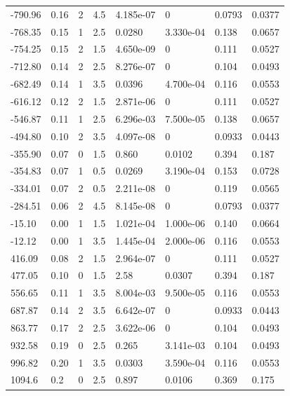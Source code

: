 \documentclass[preview]{standalone}
\begin{document}
{{\begin{tabular}{L{1.2cm}C{1.2cm} C{0.3cm}C{0.5cm} C{1.4cm}C{1.4cm} C{1.4cm}C{1.4cm}}
  -790.96  &  0.16  & 2     & 4.5 &  4.185e-07  & 0  & 0.0793 &  0.0377   \\ 
  -768.35  &  0.15  & 1     & 2.5 &  0.0280  & 3.330e-04  & 0.138 &  0.0657   \\ 
  -754.25  &  0.15  & 2     & 1.5 &  4.650e-09  & 0  & 0.111 &  0.0527   \\ 
  -712.80  &  0.14  & 2     & 2.5 &  8.276e-07  & 0  & 0.104 &  0.0493   \\ 
  -682.49  &  0.14  & 1     & 3.5 &  0.0396  & 4.700e-04  & 0.116 &  0.0553   \\ 
  -616.12  &  0.12  & 2     & 1.5 &  2.871e-06  & 0  & 0.111 &  0.0527   \\ 
  -546.87  &  0.11  & 1     & 2.5 &  6.296e-03  & 7.500e-05  & 0.138 &  0.0657   \\ 
  -494.80  &  0.10  & 2     & 3.5 &  4.097e-08  & 0  & 0.0933 &  0.0443   \\ 
  -355.90  &  0.07  & 0     & 1.5 &  0.860  & 0.0102  & 0.394 &  0.187   \\ 
  -354.83  &  0.07  & 1     & 0.5 &  0.0269  & 3.190e-04  & 0.153 &  0.0728   \\ 
  -334.01  &  0.07  & 2     & 0.5 &  2.211e-08  & 0  & 0.119 &  0.0565   \\ 
  -284.51  &  0.06  & 2     & 4.5 &  8.145e-08  & 0  & 0.0793 &  0.0377   \\ 
  -15.10  &  0.00  & 1     & 1.5 &  1.021e-04  & 1.000e-06  & 0.140 &  0.0664   \\ 
  -12.12  &  0.00  & 1     & 3.5 &  1.445e-04  & 2.000e-06  & 0.116 &  0.0553   \\ 
  416.09  &  0.08  & 2     & 1.5 &  2.964e-07  & 0  & 0.111 &  0.0527   \\ 
  477.05  &  0.10  & 0     & 1.5 &  2.58  & 0.0307  & 0.394 &  0.187   \\ 
  556.65  &  0.11  & 1     & 3.5 &  8.004e-03  & 9.500e-05  & 0.116 &  0.0553   \\ 
  687.87  &  0.14  & 2     & 3.5 &  6.642e-07  & 0  & 0.0933 &  0.0443   \\ 
  863.77  &  0.17  & 2     & 2.5 &  3.622e-06  & 0  & 0.104 &  0.0493   \\ 
  932.58  &  0.19  & 0     & 2.5 &  0.265  & 3.141e-03  & 0.104 &  0.0493   \\ 
  996.82  &  0.20  & 1     & 3.5 &  0.0303  & 3.590e-04  & 0.116 &  0.0553   \\ 
  1094.6  &   0.2  & 0     & 2.5 &  0.897  & 0.0106  & 0.369 &  0.175   \\ 

\end{tabular}}}
\end{document}
